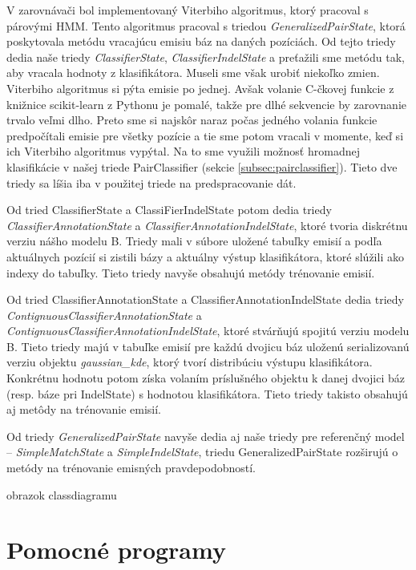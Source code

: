 V zarovnávači bol implementovaný Viterbiho algoritmus, ktorý pracoval s párovými HMM. Tento algoritmus pracoval s triedou \textit{GeneralizedPairState}, ktorá poskytovala metódu  vracajúcu emisiu báz na daných pozíciách. Od tejto triedy dedia naše triedy \textit{ClassifierState}, \textit{ClassifierIndelState} a preťažili sme metódu  tak, aby vracala hodnoty z klasifikátora. Museli sme však urobiť niekoľko zmien. Viterbiho algoritmus si pýta emisie po jednej. Avšak volanie C-čkovej funkcie z knižnice scikit-learn z Pythonu je pomalé, takže pre dlhé sekvencie by zarovnanie trvalo veľmi dlho. Preto sme si najskôr naraz počas jedného volania funkcie predpočítali emisie pre všetky pozície a tie sme potom vracali v momente, keď si ich Viterbiho algoritmus vypýtal. Na to sme využili možnosť hromadnej klasifikácie v našej triede PairClassifier (sekcie \ref{subsec:pairclassifier}). Tieto dve triedy sa líšia iba v použitej triede na predspracovanie dát.

Od tried ClassifierState a ClassiFierIndelState potom dedia triedy \textit{ClassifierAnnotationState} a \textit{ClassifierAnnotationIndelState}, ktoré tvoria diskrétnu verziu nášho modelu B. Triedy mali v súbore uložené tabuľky emisií a podľa aktuálnych pozícií si zistili bázy a aktuálny výstup klasifikátora, ktoré slúžili ako indexy do tabuľky. Tieto triedy navyše obsahujú metódy trénovanie emisií.

Od tried ClassifierAnnotationState a ClassifierAnnotationIndelState dedia triedy \textit{ContignuousClassifierAnnotationState} a \textit{ContignuousClassifierAnnotationIndelState}, ktoré stvárňujú spojitú verziu modelu B. Tieto triedy majú v tabuľke emisií pre každú dvojicu báz uloženú serializovanú verziu objektu \textit{gaussian\_kde}, ktorý tvorí distribúciu výstupu klasifikátora. Konkrétnu hodnotu potom získa volaním príslušného objektu k danej dvojici báz (resp. báze pri IndelState) s hodnotou klasifikátora. Tieto triedy takisto obsahujú aj metôdy na trénovanie emisií.

Od triedy \textit{GeneralizedPairState} navyše dedia aj naše triedy pre referenčný model -- \textit{SimpleMatchState} a \textit{SimpleIndelState}, triedu GeneralizedPairState rozširujú o metódy na trénovanie emisných pravdepodobností.

\todo obrazok classdiagramu

\section{Pomocné programy}
